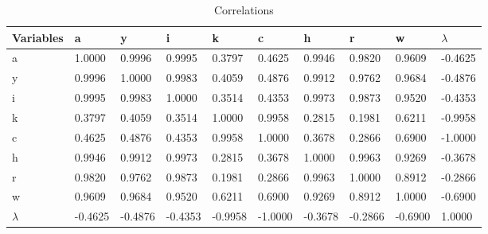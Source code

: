 \documentclass[10pt,letter]{article}
\begin{document}
\begin{table}[H]
	\centering
	\begin{tabular}{l|lllllllll}
		Variables & a       & y       & i       & k       & c       & h       & r       & w       & $\lambda$  \\\hline
		a         & 1.0000  & 0.9996  & 0.9995  & 0.3797  & 0.4625  & 0.9946  & 0.9820  & 0.9609  & -0.4625 \\
		y         & 0.9996  & 1.0000  & 0.9983  & 0.4059  & 0.4876  & 0.9912  & 0.9762  & 0.9684  & -0.4876 \\
		i         & 0.9995  & 0.9983  & 1.0000  & 0.3514  & 0.4353  & 0.9973  & 0.9873  & 0.9520  & -0.4353 \\
		k         & 0.3797  & 0.4059  & 0.3514  & 1.0000  & 0.9958  & 0.2815  & 0.1981  & 0.6211  & -0.9958 \\
		c         & 0.4625  & 0.4876  & 0.4353  & 0.9958  & 1.0000  & 0.3678  & 0.2866  & 0.6900  & -1.0000 \\
		h         & 0.9946  & 0.9912  & 0.9973  & 0.2815  & 0.3678  & 1.0000  & 0.9963  & 0.9269  & -0.3678 \\
		r         & 0.9820  & 0.9762  & 0.9873  & 0.1981  & 0.2866  & 0.9963  & 1.0000  & 0.8912  & -0.2866 \\
		w         & 0.9609  & 0.9684  & 0.9520  & 0.6211  & 0.6900  & 0.9269  & 0.8912  & 1.0000  & -0.6900 \\
		$\lambda$    & -0.4625 & -0.4876 & -0.4353 & -0.9958 & -1.0000 & -0.3678 & -0.2866 & -0.6900 & 1.0000 
	\end{tabular}
\caption{Correlations}
\end{table}
\end{document}
